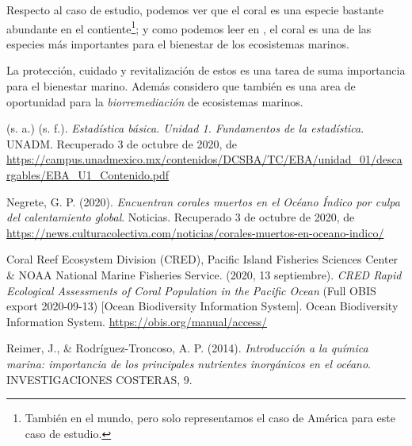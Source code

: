 \documentclass[12pt]{article}
\begin{document}
	\par Respecto al caso de estudio, podemos ver que el coral es una especie bastante abundante en el contiente\footnote{Tambi\'en en el mundo, pero solo representamos el caso de Am\'erica para este caso de estudio.}; y como podemos leer en \cite{coral}, el coral es una de las especies m\'as importantes para el bienestar de los ecosistemas marinos. 
	\par La protecci\'on, cuidado y revitalización de estos es una tarea de suma importancia para el bienestar marino. Adem\'as considero que tambi\'en es una area de oportunidad para la \textit{biorremediaci\'on} de ecosistemas marinos.
	



\newpage
\begin{thebibliography}{X}
	 (s. a.) (s. f.). \textit{Estadística básica. Unidad 1. Fundamentos de la estadística}. UNADM. Recuperado 3 de octubre de 2020, de \url{https://campus.unadmexico.mx/contenidos/DCSBA/TC/EBA/unidad_01/descargables/EBA_U1_Contenido.pdf}
	
	 Negrete, G. P. (2020). \textit{Encuentran corales muertos en el Océano Índico por culpa del calentamiento global}. Noticias. Recuperado 3 de octubre de 2020, de \url{https://news.culturacolectiva.com/noticias/corales-muertos-en-oceano-indico/}
	
	 Coral Reef Ecosystem Division (CRED), Pacific Island Fisheries Sciences Center \& NOAA National Marine Fisheries Service. (2020, 13 septiembre). \textit{CRED Rapid Ecological Assessments of Coral Population in the Pacific Ocean} (Full OBIS export 2020-09-13) [Ocean Biodiversity Information System]. Ocean Biodiversity Information System. \url{https://obis.org/manual/access/}
	
	 Reimer, J., \& Rodríguez-Troncoso, A. P. (2014). \textit{Introducción a la química marina: importancia de los principales nutrientes inorgánicos en el océano}. INVESTIGACIONES COSTERAS, 9.

\end{thebibliography}
\end{document}
